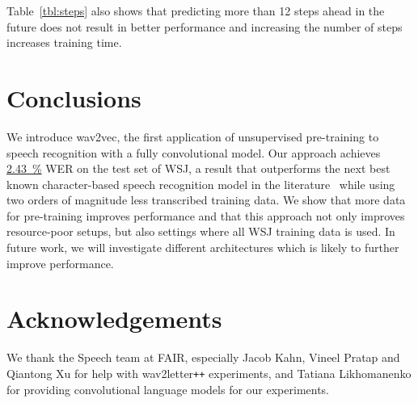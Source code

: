 \documentclass{article} \pdfoutput=1
\newcommand{\wav}{wav2vec}
\newcommand{\wavtoletter}{wav2letter\texttt{+\!+}}
\newcommand{\fullwsjresult}{\hyperref[tbl:wsj-results]{{\SI{2.43}{\percent}}}}
\begin{document}
Table~\ref{tbl:steps} also shows that predicting more than 12 steps ahead in the future does not result in better performance and increasing the number of steps increases training time.

\section{Conclusions}

We introduce \wav{}, the first application of unsupervised pre-training to speech recognition with a fully convolutional model.
Our approach achieves \fullwsjresult{} WER on the test set of WSJ, a result that outperforms the next best known character-based speech recognition model in the literature~\citep{amodei2016deepspeech} while using two orders of magnitude less transcribed training data.
We show that more data for pre-training improves performance and that this approach not only improves resource-poor setups, but also settings where all WSJ training data is used.
In future work, we will investigate different architectures which is likely to further improve performance.

\section*{Acknowledgements}

We thank the Speech team at FAIR, especially Jacob Kahn, Vineel Pratap and Qiantong Xu for help with \wavtoletter{} experiments, and Tatiana Likhomanenko for providing convolutional language models for our experiments.




\small

\end{document}
